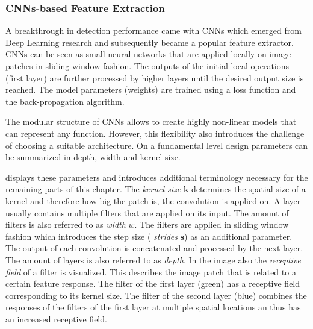 \subsubsection{\acp{CNN}-based Feature Extraction}

A breakthrough in detection performance came with \acp{CNN} which emerged from Deep Learning research and subsequently became a popular feature extractor. \acp{CNN} can be seen as small neural networks that are applied locally on image patches in sliding window fashion. The outputs of the initial local operations (first layer) are further processed by higher layers until the desired output size is reached. The model parameters (weights) are trained using a loss function and the back-propagation algorithm.

The modular structure of \acp{CNN} allows to create highly non-linear models that can represent any function. However, this flexibility also introduces the challenge of choosing a suitable architecture. On a fundamental level design parameters can be summarized in depth, width and kernel size. 

 displays these parameters and introduces additional terminology necessary for the remaining parts of this chapter. The \textit{kernel size} $\textbf{k}$ determines the spatial size of a kernel and therefore how big the patch is, the convolution is applied on. A layer usually contains multiple filters that are applied on its input. The amount of filters is also referred to as \textit{width} $w$. The filters are applied in sliding window fashion which introduces the step size ( \textit{strides} $\mathbf{s}$) as an additional parameter. The output of each convolution is concatenated and processed by the next layer. The amount of layers is also referred to as \textit{depth}. In the image also the \textit{receptive field} of a filter is visualized. This describes the image patch that is related to a certain feature response. The filter of the first layer (green) has a receptive field corresponding to its kernel size. The filter of the second layer (blue) combines the responses of the filters of the first layer at multiple spatial locations an thus has an increased receptive field.

